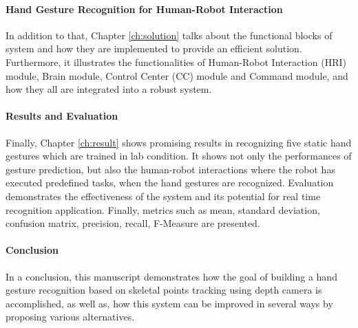 \paragraph*{Hand Gesture Recognition for Human-Robot Interaction} In addition to that, Chapter \ref{ch:solution} talks about the functional blocks of system and how they are implemented to provide an efficient solution. Furthermore, it illustrates the functionalities of Human-Robot Interaction (HRI) module, Brain module, Control Center (CC) module and Command module, and how they all are integrated into a robust system.

\paragraph*{Results and Evaluation} Finally, Chapter \ref{ch:result} shows promising results in recognizing five static hand gestures which are trained in lab condition. It shows not only the performances of gesture prediction, but also the human-robot interactions where the robot has executed predefined tasks, when the hand gestures are recognized. Evaluation demonstrates the effectiveness of the system and its potential for real time recognition application. Finally, metrics such as mean, standard deviation, confusion matrix, precision, recall, F-Measure are presented.

\paragraph*{Conclusion} In a conclusion, this manuscript demonstrates how the goal of building a hand gesture recognition based on skeletal points tracking using depth camera is accomplished, as well as, how this system can be improved in several ways by proposing various alternatives.
